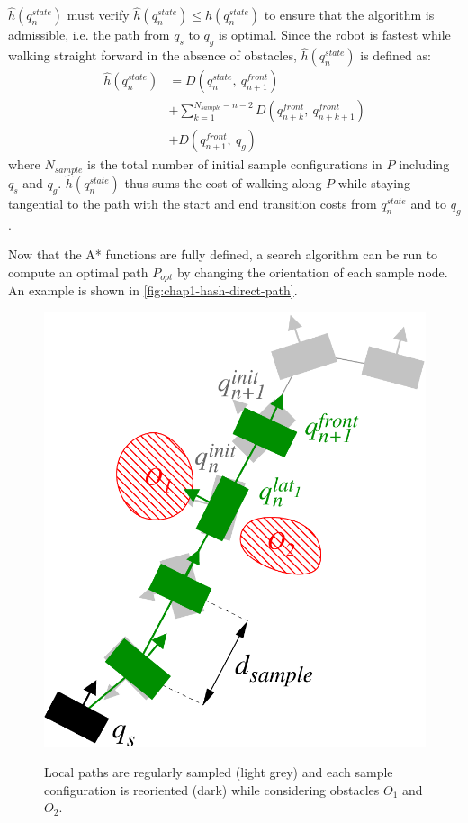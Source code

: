 $\hat{h}(q_n^{state})$ must verify $\hat{h}(q_n^{state}) \leq
h(q_n^{state})$ to ensure that the algorithm is admissible, i.e. the
path from $q_s$ to $q_g$ is optimal. Since the robot is fastest while
walking straight forward in the absence of obstacles,
$\hat{h}(q_n^{state})$ is defined as:
\begin{equation}
  \begin{split}
  \hat{h}(q_n^{state}) &= D(q_n^{state},~q_{n+1}^{front}) \\
  &+ \sum_{k=1}^{N_{sample}-n-2} D(q_{n+k}^{front},~q_{n+k+1}^{front}) \\
  &+ D(q_{n+1}^{front},~q_g)
  \end{split}
\end{equation}
where $N_{sample}$ is the total number of initial sample
configurations in $P$ including $q_s$ and
$q_g$. $\hat{h}(q_n^{state})$ thus sums the cost of walking along $P$
while staying tangential to the path with the start and
end transition costs from $q_n^{state}$ and to $q_g$.

Now that the A* functions are fully defined, a search algorithm can be
run to compute an optimal path $P_{opt}$ by changing the orientation
of each sample node. An example is shown in
\autoref{fig:chap1-hash-direct-path}.

\begin{figure}
  \centering
      {\includegraphics[width = 0.75\linewidth]
        {src/chap1-path-optimization/hash-direct-path.pdf}}
      \caption{Local paths are regularly sampled (light grey) and each
        sample configuration is reoriented (dark) while considering
        obstacles $O_1$ and $O_2$.}
      \label{fig:chap1-hash-direct-path}
\end{figure}

